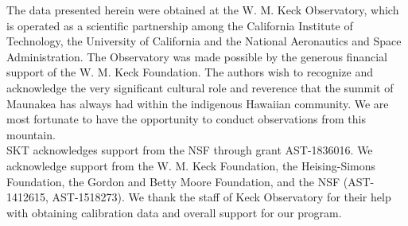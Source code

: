 \documentclass[]{spie}  %
\begin{document}
\acknowledgments

The data presented herein were obtained at the W. M. Keck Observatory, which is operated as a scientific partnership among the California Institute of Technology, the University of California and the National Aeronautics and Space Administration.
The Observatory was made possible by the generous financial support of the W. M. Keck Foundation.
The authors wish to recognize and acknowledge the very significant cultural role and reverence that the summit of Maunakea has always had within the indigenous Hawaiian community.
We are most fortunate to have the opportunity to conduct observations from this mountain.
\\
\indent SKT acknowledges support from the NSF through grant AST-1836016. We acknowledge support from the W. M. Keck Foundation, the Heising-Simons Foundation, the Gordon and Betty Moore Foundation, and the NSF (AST-1412615, AST-1518273). We thank the staff of Keck Observatory for their help with obtaining calibration data and overall support for our program.


\clearpage

\end{document}
